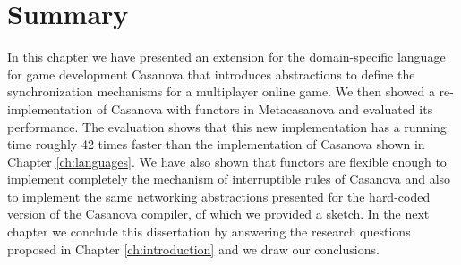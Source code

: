 \section{Summary}
In this chapter we have presented an extension for the domain-specific language for game development Casanova that introduces abstractions to define the synchronization mechanisms for a multiplayer online game. We then showed a re-implementation of Casanova with functors in Metacasanova and evaluated its performance. The evaluation shows that this new implementation has a running time roughly 42 times faster than the implementation of Casanova shown in Chapter \ref{ch:languages}. We have also shown that functors are flexible enough to implement completely the mechanism of interruptible rules of Casanova and also to implement the same networking abstractions presented for the hard-coded version of the Casanova compiler, of which we provided a sketch. In the next chapter we conclude this dissertation by answering the research questions proposed in Chapter \ref{ch:introduction} and we draw our conclusions.
